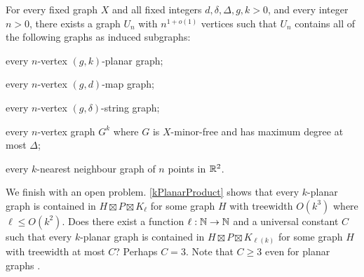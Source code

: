 \documentclass{patmorin}
\newcommand{\note}[2]{\noindent{\color{red}[#1:~#2]}}
\renewcommand{\geq}{\geqslant}
\renewcommand{\leq}{\leqslant}
\begin{document}
\begin{thm}
	\label{UniversalUniversal}
	For every fixed graph $X$ and all fixed integers $d,\delta,\Delta,g,k>0$, and every integer
	$n>0$, there exists a graph $U_n$ with $n^{1+o(1)}$ vertices such that
	$U_n$ contains all of the following graphs as induced subgraphs:
	\begin{compactitem}
		\item every $n$-vertex $(g,k)$-planar graph;
		\item every $n$-vertex $(g,d)$-map graph;
		\item every $n$-vertex $(g,\delta)$-string graph;
		\item every $n$-vertex graph $G^k$ where $G$ is $X$-minor-free and has maximum degree at most $\Delta$;
		\item every $k$-nearest neighbour graph of $n$ points in $\mathbb{R}^2$.
	\end{compactitem}
\end{thm}

We finish with an open problem. \cref{kPlanarProduct} shows that every $k$-planar graph is contained in $H\boxtimes P \boxtimes K_\ell$ for some graph $H$ with treewidth $O(k^3)$ where $\ell\leq O(k^2)$. Does there exist a function $\ell:\mathbb{N}\to\mathbb{N}$ and a universal constant $C$ such that every $k$-planar graph is contained in $H\boxtimes P \boxtimes K_{\ell(k)}$ for some graph $H$ with treewidth at most $C$?  Perhaps $C=3$. Note that $C\geq 3$ even for planar graphs \citep{DJMMUW20}.


   \let\oldthebibliography=\thebibliography
   \let\endoldthebibliography=\endthebibliography
   \renewenvironment{thebibliography}[1]{%
     \begin{oldthebibliography}{#1}%
       \setlength{\parskip}{0ex}%
       \setlength{\itemsep}{0ex}%
   }{\end{oldthebibliography}}



\end{document}
